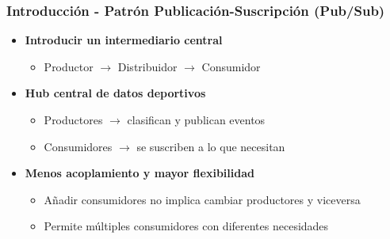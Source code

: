 \documentclass[aspectratio=169]{beamer}
\begin{document}
\begin{frame}\frametitle{Introducción - Patrón Publicación-Suscripción (Pub/Sub)}
\begin{itemize}
  \item \textbf{Introducir un intermediario central}
  \begin{itemize}
    \item Productor $\rightarrow$ Distribuidor $\rightarrow$ Consumidor
  \end{itemize}

  \vspace{1em}

  \item \textbf{Hub central de datos deportivos}
  \begin{itemize}
    \item Productores $\rightarrow$ clasifican y publican eventos
    \item Consumidores $\rightarrow$ se suscriben a lo que necesitan
  \end{itemize}

  \vspace{1em}

  \item \textbf{Menos acoplamiento y mayor flexibilidad}
  \begin{itemize}
    \item Añadir consumidores no implica cambiar productores y viceversa
    \item Permite múltiples consumidores con diferentes necesidades
  \end{itemize}
\end{itemize}
\end{frame}
\end{document}
